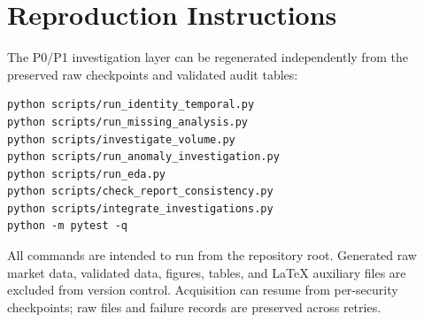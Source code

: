\section{Reproduction Instructions}


The P0/P1 investigation layer can be regenerated independently from the
preserved raw checkpoints and validated audit tables:

\begin{verbatim}
python scripts/run_identity_temporal.py
python scripts/run_missing_analysis.py
python scripts/investigate_volume.py
python scripts/run_anomaly_investigation.py
python scripts/run_eda.py
python scripts/check_report_consistency.py
python scripts/integrate_investigations.py
python -m pytest -q
\end{verbatim}

All commands are intended to run from the repository root. Generated raw market
data, validated data, figures, tables, and LaTeX auxiliary files are excluded
from version control. Acquisition can resume from per-security checkpoints;
raw files and failure records are preserved across retries.
